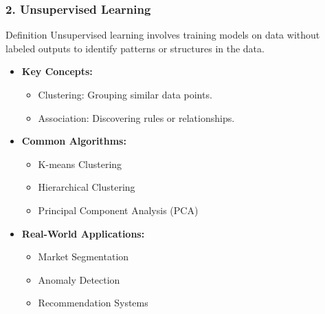 \documentclass[aspectratio=169]{beamer}
\begin{document}
\begin{frame}[fragile]
    \frametitle{2. Unsupervised Learning}
    \begin{block}{Definition}
        Unsupervised learning involves training models on data without labeled outputs to identify patterns or structures in the data.
    \end{block}
    
    \begin{itemize}
        \item \textbf{Key Concepts:}
        \begin{itemize}
            \item Clustering: Grouping similar data points.
            \item Association: Discovering rules or relationships.
        \end{itemize}
        
        \item \textbf{Common Algorithms:}
        \begin{itemize}
            \item K-means Clustering
            \item Hierarchical Clustering
            \item Principal Component Analysis (PCA)
        \end{itemize}
        
        \item \textbf{Real-World Applications:}
        \begin{itemize}
            \item Market Segmentation
            \item Anomaly Detection
            \item Recommendation Systems
        \end{itemize}
    \end{itemize}
\end{frame}
\end{document}
